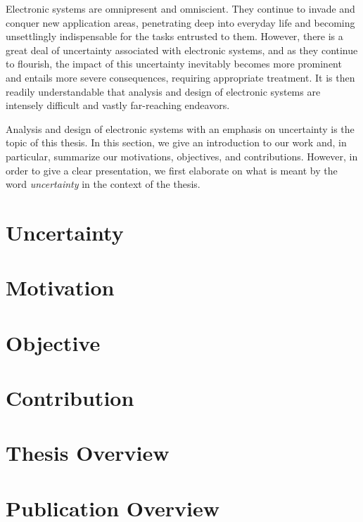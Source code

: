 Electronic systems are omnipresent and omniscient. They continue to invade and
conquer new application areas, penetrating deep into everyday life and becoming
unsettlingly indispensable for the tasks entrusted to them. However, there is a
great deal of uncertainty associated with electronic systems, and as they
continue to flourish, the impact of this uncertainty inevitably becomes more
prominent and entails more severe consequences, requiring appropriate treatment.
It is then readily understandable that analysis and design of electronic systems
are intensely difficult and vastly far-reaching endeavors.

Analysis and design of electronic systems with an emphasis on uncertainty is the
topic of this thesis. In this section, we give an introduction to our work and,
in particular, summarize our motivations, objectives, and contributions.
However, in order to give a clear presentation, we first elaborate on what is
meant by the word \emph{uncertainty} in the context of the thesis.

\section{Uncertainty}

\section{Motivation}

\section{Objective}

\section{Contribution}

\section{\pasttitle}

\section{Thesis Overview}

\section{Publication Overview}

